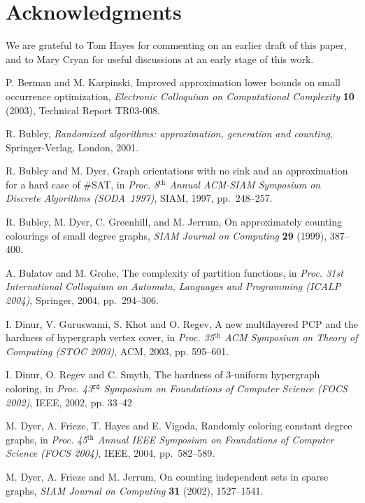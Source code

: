 \documentclass[11pt]{article}
\theoremstyle{definition}
\theoremstyle{remark}
\begin{document}
\section*{Acknowledgments}

We are grateful to Tom Hayes for commenting on an earlier draft of this paper,
and to Mary Cryan for useful discussions at an early stage of this work.

\begin{thebibliography}{99}

 P. Berman and M. Karpinski, Improved approximation lower bounds
on small occurrence optimization, \emph{Electronic Colloquium on
Computational Complexity} \textbf{10} (2003), Technical Report
TR03-008.

 R. Bubley,
\emph{Randomized algorithms: approximation, generation and counting},
Springer-Verlag, London, 2001.

 R. Bubley and M. Dyer, Graph orientations with no sink
and an approximation for a hard case of \#SAT, in \emph{Proc.
8${}^\textrm{th}$ Annual ACM-SIAM Symposium on Discrete Algorithms
(SODA~1997)}, SIAM, 1997, pp.~248--257.

 R. Bubley, M. Dyer, C. Greenhill, and M. Jerrum, On approximately
counting colourings of small degree graphs, \emph{SIAM Journal on Computing}
\textbf{29} (1999), 387--400.

 A. Bulatov and M. Grohe,
The complexity of partition functions, in \emph{Proc. 31st International Colloquium
on Automata, Languages and Programming (ICALP 2004)}, Springer, 2004,
pp.~294--306.

  I. Dinur, V. Guruswami, S. Khot and O. Regev,
A new multilayered PCP and the hardness of hypergraph vertex cover, in
\emph{Proc. 35${}^\textrm{th}$ ACM Symposium on Theory of Computing (STOC
2003)}, ACM, 2003, pp. 595--601.

   I. Dinur, O. Regev and C. Smyth,
The hardness of {3-uniform} hypergraph coloring, in \emph{Proc.
43${}^\texttt{rd}$ Symposium on Foundations of Computer Science ({FOCS
2002})}, IEEE, 2002, pp. 33--42

 M. Dyer, A. Frieze, T. Hayes and E. Vigoda, Randomly
coloring constant degree graphs, in \emph{Proc. 45${}^\textrm{th}$ Annual
IEEE Symposium on Foundations of Computer Science (FOCS 2004)}, IEEE, 2004,
pp.~582--589.

 M. Dyer, A. Frieze and M. Jerrum, On counting independent
sets in sparse graphs, \emph{SIAM Journal on Computing} \textbf{31} (2002),
1527--1541.


\end{thebibliography}
\end{document}

